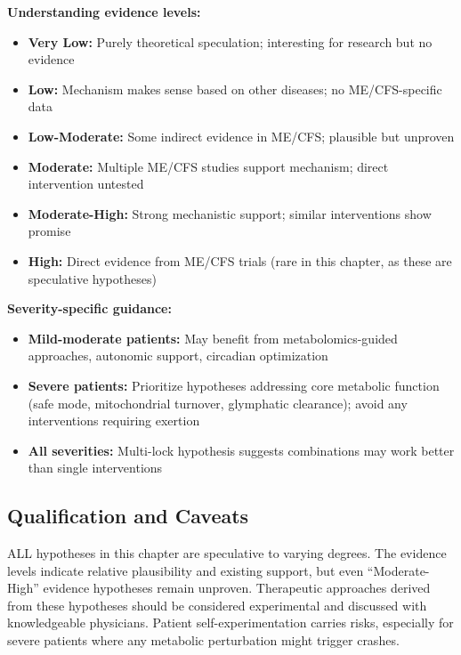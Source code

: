 \textbf{Understanding evidence levels:}
\begin{itemize}
    \item \textbf{Very Low:} Purely theoretical speculation; interesting for research but no evidence
    \item \textbf{Low:} Mechanism makes sense based on other diseases; no ME/CFS-specific data
    \item \textbf{Low-Moderate:} Some indirect evidence in ME/CFS; plausible but unproven
    \item \textbf{Moderate:} Multiple ME/CFS studies support mechanism; direct intervention untested
    \item \textbf{Moderate-High:} Strong mechanistic support; similar interventions show promise
    \item \textbf{High:} Direct evidence from ME/CFS trials (rare in this chapter, as these are speculative hypotheses)
\end{itemize}

\textbf{Severity-specific guidance:}
\begin{itemize}
    \item \textbf{Mild-moderate patients:} May benefit from metabolomics-guided approaches, autonomic support, circadian optimization
    \item \textbf{Severe patients:} Prioritize hypotheses addressing core metabolic function (safe mode, mitochondrial turnover, glymphatic clearance); avoid any interventions requiring exertion
    \item \textbf{All severities:} Multi-lock hypothesis suggests combinations may work better than single interventions
\end{itemize}

\subsection{Qualification and Caveats}

\begin{warning}
ALL hypotheses in this chapter are speculative to varying degrees. The evidence levels indicate relative plausibility and existing support, but even ``Moderate-High'' evidence hypotheses remain unproven. Therapeutic approaches derived from these hypotheses should be considered experimental and discussed with knowledgeable physicians. Patient self-experimentation carries risks, especially for severe patients where any metabolic perturbation might trigger crashes.
\end{warning}


